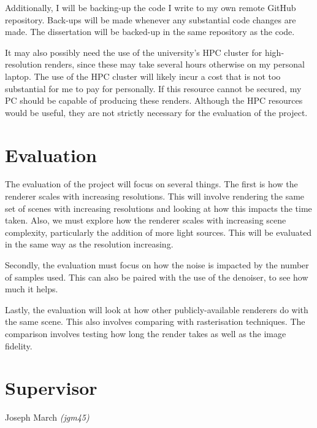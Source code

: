 \documentclass[12pt, a4paper]{article}
\begin{document}
    Additionally, I will be backing-up the code I write to my own remote GitHub repository. Back-ups will be made whenever any substantial code changes are made. The dissertation will be backed-up in the same repository as the code.

    It may also possibly need the use of the university’s HPC cluster for high-resolution renders, since these may take several hours otherwise on my personal laptop. The use of the HPC cluster will likely incur a cost that is not too substantial for me to pay for personally. If this resource cannot be secured, my PC should be capable of producing these renders. Although the HPC resources would be useful, they are not strictly necessary for the evaluation of the project.

    \section*{Evaluation}
    The evaluation of the project will focus on several things. The first is how the renderer scales with increasing resolutions. This will involve rendering the same set of scenes with increasing resolutions and looking at how this impacts the time taken. Also, we must explore how the renderer scales with increasing scene complexity, particularly the addition of more light sources. This will be evaluated in the same way as the resolution increasing.

    Secondly, the evaluation must focus on how the noise is impacted by the number of samples used. This can also be paired with the use of the denoiser, to see how much it helps.

    Lastly, the evaluation will look at how other publicly-available renderers do with the same scene. This also involves comparing with rasterisation techniques. The comparison involves testing how long the render takes as well as the image fidelity.

    \section*{Supervisor}
    Joseph March \emph{(jgm45)}
\end{document}
